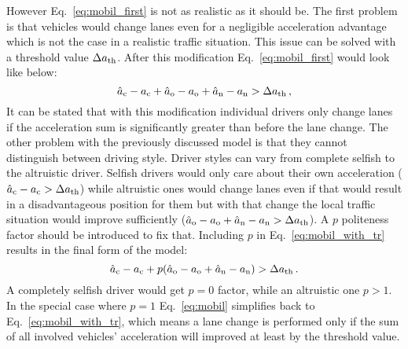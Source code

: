 			However Eq.~\eqref{eq:mobil_first} is not as realistic as it should be. The first problem is that vehicles would change lanes even for a negligible acceleration advantage which is not the case in a realistic traffic situation. This issue can be solved with a threshold value $\Delta a_{\rm th}$. After this modification Eq.~\eqref{eq:mobil_first} would look like below:
			\begin{equation}
				\hat{a}_{\rm c} - a_{\rm c} + \hat{a}_{\rm o} - a_{\rm o} + \hat{a}_{\rm n} - a_{\rm n} > \Delta a_{\rm th}\,,
				\label{eq:mobil_with_tr}
			\end{equation}
			It can be stated that with this modification individual drivers only change lanes if the acceleration sum is significantly greater than before the lane change. The other problem with the previously discussed model is that they cannot distinguish between driving style. Driver styles can vary from complete selfish to the altruistic driver. Selfish drivers would only care about their own acceleration ($\hat{a}_{\rm c} - a_{\rm c} > \Delta a_{\rm th}$) while altruistic ones would change lanes even if that would result in a disadvantageous position for them but with that change the local traffic situation would improve sufficiently ($\hat{a}_{\rm o} - a_{\rm o} + \hat{a}_{\rm n} - a_{\rm n} > \Delta a_{\rm th}$). A $p$ politeness factor should be introduced to fix that. Including $p$ in Eq.~\eqref{eq:mobil_with_tr} results in the final form of the model:
			\begin{equation}
				\hat{a}_{\rm c} - a_{\rm c} + p(\hat{a}_{\rm o} - a_{\rm o} + \hat{a}_{\rm n} - a_{\rm n}) > \Delta a_{\rm th}\,.
				\label{eq:mobil}
			\end{equation}
			A completely selfish driver would get $p=0$ factor, while an altruistic one $p>1$. In the special case where $p=1$ Eq.~\eqref{eq:mobil} simplifies back to Eq.~\eqref{eq:mobil_with_tr}, which means a lane change is performed only if the sum of all involved vehicles' acceleration will improved at least by the threshold value.
